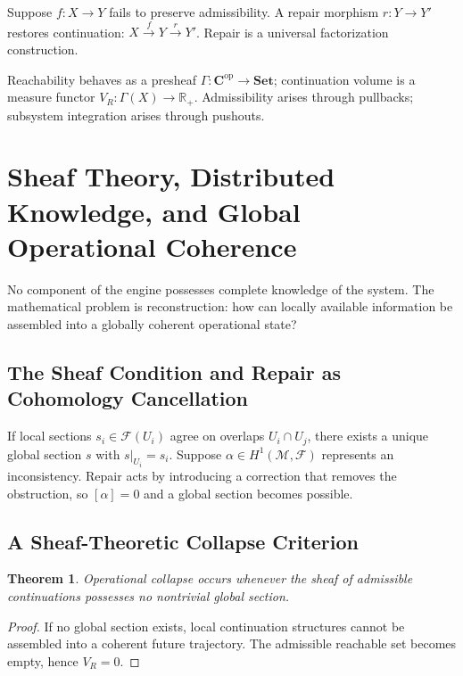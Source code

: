 \documentclass[12pt,a4paper]{article}
\newtheorem{theorem}{Theorem}[section]
\newcommand{\M}{\mathcal{M}}
\begin{document}
Suppose $f : X \to Y$ fails to preserve admissibility. A repair morphism $r : Y \to Y'$ restores continuation:
$X \overset{f}{\to} Y \overset{r}{\to} Y'$. Repair is a universal factorization construction.

Reachability behaves as a presheaf $\Gamma : \mathbf{C}^{\mathrm{op}} \to \mathbf{Set}$; continuation volume is a measure functor $V_R : \Gamma(X) \to \mathbb{R}_+$. Admissibility arises through pullbacks; subsystem integration arises through pushouts.

\section{Sheaf Theory, Distributed Knowledge, and Global Operational Coherence}

No component of the engine possesses complete knowledge of the system. The mathematical problem is reconstruction: how can locally available information be assembled into a globally coherent operational state?

\subsection{The Sheaf Condition and Repair as Cohomology Cancellation}

If local sections $s_i \in \mathcal{F}(U_i)$ agree on overlaps $U_i \cap U_j$, there exists a unique global section $s$ with $s|_{U_i} = s_i$. Suppose $\alpha \in H^1(\M, \mathcal{F})$ represents an inconsistency. Repair acts by introducing a correction that removes the obstruction, so $[\alpha] = 0$ and a global section becomes possible.

\subsection{A Sheaf-Theoretic Collapse Criterion}

\begin{theorem}
Operational collapse occurs whenever the sheaf of admissible continuations possesses no nontrivial global section.
\end{theorem}

\begin{proof}
If no global section exists, local continuation structures cannot be assembled into a coherent future trajectory. The admissible reachable set becomes empty, hence $V_R = 0$.
\end{proof}
\end{document}
